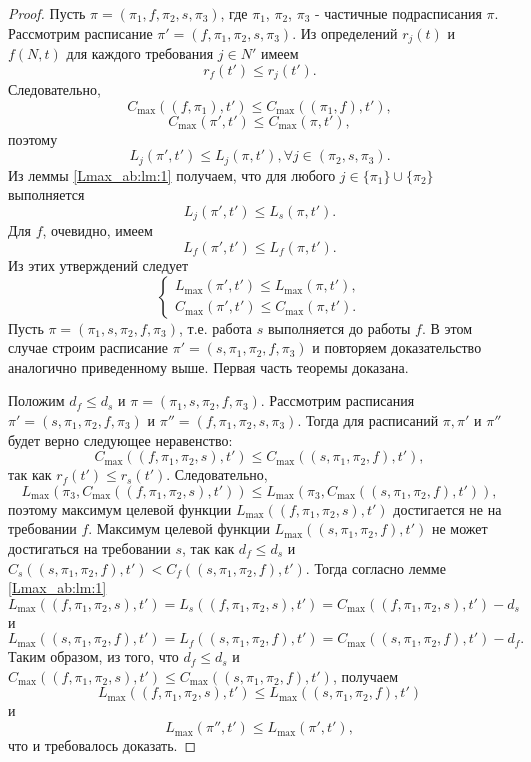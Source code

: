 \begin{proof}
Пусть  $\pi = (\pi_1, f, \pi_2, s, \pi_3)$, где $\pi_1$, $\pi_2$, $\pi_3$ - частичные подрасписания $\pi$. Рассмотрим расписание $\pi' = (f, \pi_1, \pi_2, s, \pi_3)$. Из определений $r_j(t)$ и $f(N,t)$ для каждого требования $j\in N'$ имеем
$$r_f(t')\leq r_j(t').$$
Следовательно,
$$C_{\max}((f,\pi_1),t') \leq C_{\max}((\pi_1,f),t'),$$
$$C_{\max}(\pi',t') \leq C_{\max} (\pi,t'),$$
поэтому
$$L_j(\pi',t') \leq L_j(\pi,t'), \forall j \in (\pi_2,s,\pi_3).$$
Из леммы \ref{Lmax_ab:lm:1} получаем, что для любого $j \in \{\pi_1\} \cup \{\pi_2\}$ выполняется
$$ L_j(\pi',t') \leq L_s(\pi,t').$$
Для $f$, очевидно, имеем
$$L_f(\pi',t') \leq L_f(\pi,t').$$
Из этих утверждений следует
\begin{equation*}
    \begin{cases}
        L_{\max}(\pi ', t') \leq L_{\max} (\pi, t'),\\
        C_{\max}(\pi ', t') \leq C_{\max} (\pi, t').
    \end{cases}
\end{equation*}
Пусть $\pi = (\pi_1,s,\pi_2,f,\pi_3)$, т.е. работа $s$ выполняется до работы $f$. В этом случае строим расписание $\pi' = (s, \pi_1, \pi_2, f, \pi_3)$  и повторяем доказательство аналогично приведенному выше. Первая часть теоремы доказана.

Положим $d_f \leq d_s$ и $\pi = (\pi_1,s,\pi_2,f,\pi_3)$. Рассмотрим расписания $\pi' = (s,\pi_1,\pi_2,f,\pi_3)$ и $\pi'' = (f,\pi_1,\pi_2,s,\pi_3).$
Тогда для расписаний $\pi, \pi'$ и $\pi''$ будет верно следующее неравенство:
$$C_{\max}((f,\pi_1,\pi_2,s),t') \leq C_{\max} ((s,\pi_1,\pi_2,f), t'),$$
так как $r_f(t') \leq r_s(t')$. Следовательно,
$$L_{\max}(\pi_3,C_{\max}((f,\pi_1,\pi_2,s),t')) \leq L_{\max}(\pi_3,C_{\max}((s,\pi_1,\pi_2,f),t')),$$
поэтому максимум целевой функции $L_{\max}((f,\pi_1,\pi_2,s),t')$ достигается не на требовании $f$.
Максимум целевой функции $L_{\max}((s,\pi_1,\pi_2,f), t')$ не может достигаться на требовании $s$, так как $d_f \leq d_s$ и $C_s((s,\pi_1,\pi_2,f), t') < C_f((s,\pi_1,\pi_2,f), t')$. Тогда согласно лемме \ref{Lmax_ab:lm:1}
$$L_{\max}((f,\pi_1,\pi_2,s),t') = L_s((f,\pi_1,\pi_2,s),t') = C_{\max}((f,\pi_1,\pi_2,s),t') - d_s$$
и
$$L_{\max}((s,\pi_1,\pi_2,f),t') = L_f((s,\pi_1,\pi_2,f),t') = C_{\max}((s,\pi_1,\pi_2,f),t') - d_f.$$
Таким образом, из того, что $d_f \leq d_s$ и $C_{\max}((f,\pi_1,\pi_2,s), t') \leq C_{\max}((s,\pi_1,\pi_2,f), t')$, получаем
$$L_{\max}((f,\pi_1,\pi_2,s),t') \leq L_{\max}((s,\pi_1,\pi_2,f),t')$$
и
$$L_{\max}(\pi'', t') \leq L_{\max}(\pi',t'),$$
что и требовалось доказать.
\end{proof}

